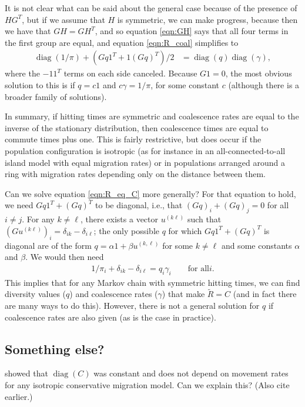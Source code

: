 \documentclass{article}
\newcommand{\comdist}{\widetilde{R}}
\DeclareMathOperator{\diag}{\mathop{\mbox{diag}}}
\begin{document}
It is not clear what can be said about the general case because of the presence of $HG^T$,
but if we assume that $H$ is symmetric, we can make progress,
because then we have that $GH = GH^T$, 
and so equation \eqref{eqn:GH} says that all four terms in the first group are equal,
and equation \eqref{eqn:R_coal} simplifies to
\begin{align} \label{eqn:R_eq_C}
    \diag(1/\pi) + (Gq 1^T + 1 (Gq)^T)/2
    &=
    \diag(q) \diag(\gamma) ,
\end{align}
where the $-1 1^T$ terms on each side canceled.
Because $G1=0$,
the most obvious solution to this is if $q = c 1$ and $c \gamma = 1/\pi$, for some constant $c$
(although there is a broader family of solutions).

In summary, if hitting times are symmetric
and coalescence rates are equal to the inverse of the stationary distribution,
then coalescence times are equal to commute times plus one.
This is fairly restrictive, 
but does occur if the population configuration is isotropic
(as for instance in an all-connected-to-all island model with equal migration rates)
or in populations arranged around a ring
with migration rates depending only on the distance between them.

Can we solve equation \eqref{eqn:R_eq_C} more generally?
For that equation to hold, we need $Gq 1^T +  (Gq)^T$ to be diagonal,
i.e., that $(Gq)_i + (Gq)_j = 0$ for all $i \neq j$.
For any $k \neq \ell$, there exists a vector $u^{(k\ell)}$ such that $(Gu^{(k\ell)})_i = \delta_{ik} - \delta_{i\ell}$;
the only possible $q$ for which $Gq 1^T +  (Gq)^T$ is diagonal
are of the form $q = \alpha 1 + \beta u^{(k,\ell)}$ for some $k \neq \ell$ and some constants $\alpha$ and $\beta$.
We would then need
\begin{align}
    1/\pi_i + \delta_{ik} - \delta_{i\ell} = q_i \gamma_i \qquad \text{for all} i.
\end{align}
This implies that for any Markov chain with symmetric hitting times,
we can find diversity values ($q$) and coalescence rates ($\gamma$) that make $\comdist = C$
(and in fact there are many ways to do this).
However, there is not a general solution for $q$ if coalescence rates are also given (as is the case in practice).

\subsection*{Something else?}

\citet{strobeck1987average} showed that $\diag(C)$ was constant and does not depend on movement rates
for any isotropic conservative migration model.
Can we explain this?
(Also cite earlier.)
\end{document}
